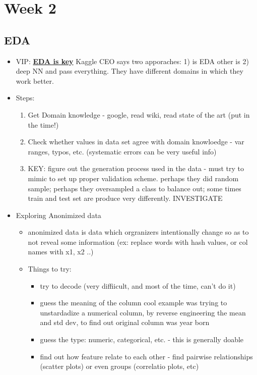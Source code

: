 \documentclass[a4paper]{report}
\begin{document}
\chapter{Week 2}
\section{EDA}
\begin{itemize}
  \item VIP: \underline{\bf EDA is key}
    \subitem Kaggle CEO says two apporaches: 1) is EDA other is 2) deep NN and pass everything. They have different domains in which they work better.
  \item Steps:
    \begin{enumerate}
      \item Get Domain knowledge - google, read wiki, read state of the art (put in the time!)
      \item Check whether values in data set agree with domain knowloedge - var ranges, typos, etc. (systematic errors can be very useful info)
      \item KEY: figure out the generation process used in the data - must try to mimic to set up proper validation scheme.
	\subitem perhaps they did random sample; perhaps they oversampled a class to balance out; some times train and test set are produce very differently. INVESTIGATE
    \end{enumerate}
  \item Exploring Anonimized data
    \begin{itemize}
      \item anonimized data is data which orgranizers intentionally change so as to not reveal some information  (ex: replace words with hash values, or col names with x1, x2 ..)
      \item Things to try:
	\begin{itemize}
	  \item try to decode (very diffiicult, and most of the time, can't do it)
	  \item guess the meaning of the column 
	    \subitem cool example was trying to unstardadize a numerical column, by reverse engineering the mean and std dev, to find out original column was year born
	  \item guess the type: numeric, categorical, etc.   - this is generally doable
	  \item find out how feature relate to each other - find pairwise relationships (scatter plots) or even groups (correlatio plots, etc)
	\end{itemize}

\end{itemize}
\end{itemize}
\end{document}
